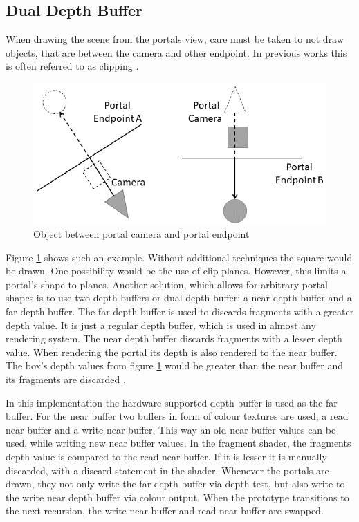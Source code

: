\subsection{Dual Depth Buffer}

When drawing the scene from the portals view, care must be taken to not draw objects, that are between the camera and other endpoint. In previous works this is often referred to as clipping \cite{lowe:2005:technique}.
\begin{figure}[h]
	\includegraphics[width=\linewidth]{images/bananajuce.png}
	\caption{Object between portal camera and portal endpoint}
	\label{fig:bananajuce}
\end{figure}

Figure \ref{fig:bananajuce} shows such an example. Without additional techniques the square would be drawn. One possibility would be the use of clip planes. However, this limits a portal's shape to planes. Another solution, which allows for arbitrary portal shapes is to use two depth buffers or dual depth buffer: a near depth buffer and a far depth buffer. The far depth buffer is used to discards fragments with a greater depth value. It is just a regular depth buffer, which is used in almost any rendering system. The near depth buffer discards fragments with a lesser depth value. When rendering the portal its depth is also rendered to the near buffer. The box's depth values from figure \ref{fig:bananajuce} would be greater than the near buffer and its fragments are discarded \cite{lowe:2005:technique, ropinski:2004:real}.

In this implementation the hardware supported depth buffer is used as the far buffer. For the near buffer two buffers in form of colour textures are used, a read near buffer and a write near buffer. This way an old near buffer values can be used, while writing new near buffer values. In the fragment shader, the fragments depth value is compared to the read near buffer. If it is lesser it is manually discarded, with a discard statement in the shader. Whenever the portals are drawn, they not only write the far depth buffer via depth test, but also write to the write near depth buffer via colour output. When the prototype transitions to the next recursion, the write near buffer and read near buffer are swapped.

